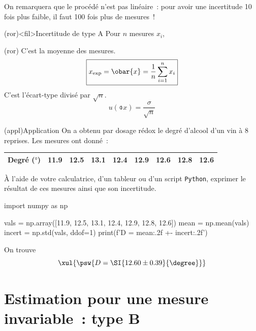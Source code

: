 \documentclass[../main/main.tex]{subfiles}
\begin{document}
On remarquera que le procédé n'est pas linéaire~: pour avoir une incertitude 10
fois plus faible, il faut 100 fois plus de mesures~!

\begin{tcb}(ror)<fil>{Incertitude de type A}
	Pour $n$ mesures $x_i$,
	\smallbreak
	\begin{isd}[cnt](ror)
		C'est la moyenne des mesures.
		\[
			\boxed{x_{\rm exp} = \obar{x} = \frac{1}{n} \sum_{i=1}^{n} x_i}
		\]
		\tcblower
		C'est l'écart-type divisé par $\sqrt{n}$.
		\[
			\boxed{u(\obar{x}) = \frac{\sigma}{\sqrt{n}}}
		\]
	\end{isd}
\end{tcb}

\begin{tcb}(appl){Application}
	On a obtenu par dosage rédox le degré d'alcool d'un vin à 8 reprises. Les
	mesures ont donné~:
	\begin{center}
		\begin{tabular}{lcccccccc}
			\toprule
			Degré ($\si{\degree}$) &
			\num{11.9}             &
			\num{12.5}             &
			\num{13.1}             &
			\num{12.4}             &
			\num{12.9}             &
			\num{12.6}             &
			\num{12.8}             &
			\num{12.6}
			\\
			\bottomrule
		\end{tabular}
	\end{center}
	À l'aide de votre calculatrice, d'un tableur ou d'un script \texttt{Python},
	exprimer le résultat de ces mesures ainsi que son incertitude.
	\tcblower
	\begin{python}
		import numpy as np

		vals = np.array([11.9, 12.5, 13.1, 12.4, 12.9, 12.8, 12.6])
		mean = np.mean(vals)
		incert = np.std(vals, ddof=1)
		print(f'D = {mean:.2f} +- {incert:.2f}')
	\end{python}
	On trouve
	\[
		\xul{
			\psw{
				D = \SI{12.60 \pm  0.39}{\degree}
			}
		}
	\]
\end{tcb}

\section{Estimation pour une mesure invariable~: type B}
\end{document}
